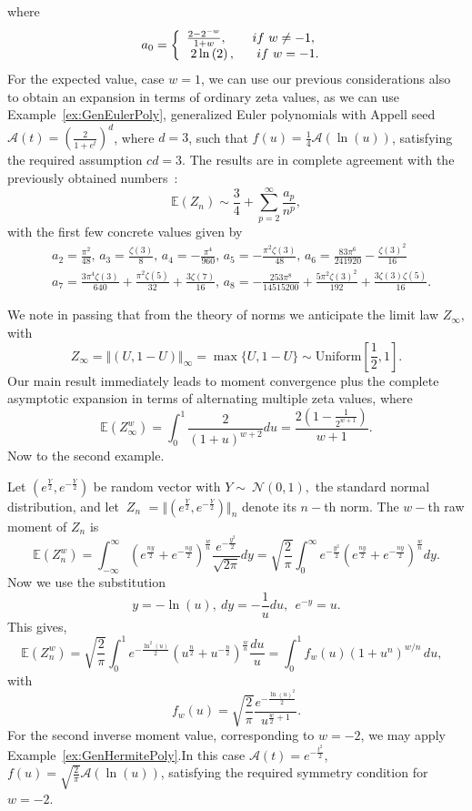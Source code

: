 \documentclass[10pt,reqno,a4paper]{amsart}%
\theoremstyle{definition}
\newcommand{\E}{\ensuremath{\mathbb{E}}} %
\newcommand{\ap}{\ensuremath{\mathcal{A}}}%
\begin{document}
where
\[
a_{0}=\left\{
\begin{array}
[c]{c}%
\frac{2-2^{-w}}{1+w},\ \ \ \ \ \ if\ w\neq-1,\ \ \\
2\ln\left(  2\right)  ,\ \ \ \ \ if\ w=-1.
\end{array}
\right.
\]
For the expected value, case $w=1$, we can use our previous considerations
also to obtain an expansion in terms of ordinary zeta values, as we can use
Example~\ref{ex:GenEulerPoly}, generalized Euler polynomials with Appell seed
$\ap(t)=(\frac{2}{1+e^{t}})^{d}$, where $d=3$, such that
$f(u)=\frac{1}{4}\ap(\ln(u))$, satisfying the required assumption
$cd=3$. The results are in complete agreement with the previously obtained
numbers~\cite{HKLL2020}:
\[
\E(Z_{n})\sim\frac{3}{4}+\sum_{p=2}^{\infty}\frac{a_{p}}{n^{p}},
\]
with the first few concrete values given by
\begin{align*}
&  a_{2}=\frac{\pi^{2}}{48},\,a_{3}=\frac{\zeta(3)}{8},\,a_{4}=-\frac{\pi^{4}%
}{960},\,a_{5}=-\frac{\pi^{2}\zeta(3)}{48},\,a_{6}=\frac{83\pi^{6}}%
{241920}-\frac{\zeta(3)^{2}}{16}\\
&  a_{7}=\frac{3\pi^{4}\zeta(3)}{640}+\frac{\pi^{2}\zeta(5)}{32}+\frac
{3\zeta(7)}{16},\,a_{8}=-\frac{253\pi^{8}}{14515200}+\frac{5\pi^{2}%
\zeta(3)^{2}}{192}+\frac{3\zeta(3)\zeta(5)}{16}.
\end{align*}


We note in passing that from the theory of norms we anticipate the limit law
$Z_{\infty}$, with
\[
Z_{\infty}=\Vert(U,1-U)\Vert_{\infty}=\max\{U,1-U\}\sim\text{Uniform}[\frac
{1}{2},1].
\]
Our main result immediately leads to moment convergence plus the complete
asymptotic expansion in terms of alternating multiple zeta values, where
\[
\E(Z_{\infty}^{w})=\int_{0}^{1}\frac{2}{(1+u)^{w+2}}du=\frac{2\left(
1-\frac{1}{2^{w+1}}\right)  }{w+1}.
\]
Now to the second example.

Let $\left(  e^{\frac{Y}{2}},e^{-\frac{Y}{2}}\right)  $ be random vector with
$Y\sim\ \mathcal{N}\left(  0,1\right)  ,$ the standard normal distribution,
and let $\ Z_{n}$ $=\Vert\left(  e^{\frac{Y}{2}},e^{-\frac{Y}{2}}\right)
\Vert_{n}$ denote its $n-$th norm. The $w-$th raw moment of $Z_{n}$
is
\[
\E(Z_{n}^{w})=\int_{-\infty}^{\infty}\left(  e^{\frac{ny}{2}%
}+e^{-\frac{ny}{2}}\right)  ^{\frac{w}{n}}\frac{e^{-\frac{y^{2}}{2}}}%
{\sqrt{2\pi}}dy=\sqrt{\frac{2}{\pi}}\int_{0}^{\infty}e^{-\frac{y^{2}}{2}%
}\left(  e^{\frac{ny}{2}}+e^{-\frac{ny}{2}}\right)  ^{\frac{w}{n}}dy.
\]
Now we use the substitution
\[
y=-\ln\left(  u\right)  ,\ dy=-\frac{1}{u}du,\ \ e^{-y}=u.
\]
This gives,%
\[
\E(Z_{n}^{w})=\sqrt{\frac{2}{\pi}}\int_{0}^{1}e^{-\frac{\ln^{2}\left(
u\right)  }{2}}\left(  u^{\frac{n}{2}}+u^{-\frac{n}{2}}\right)  ^{\frac{w}{n}%
}\frac{du}{u}=\int_{0}^{1}f_{w}(u)(1+u^{n})^{w/n}\,du,\text{ }%
\]
with%
\[
f_{w}(u)=\sqrt{\frac{2}{\pi}}\frac{e^{-\frac{\ln\left(  u\right)  ^{2}}{2}}%
}{u^{\frac{w}{2}+1}}.
\]
For the second inverse moment value, corresponding to $w=-2$, we may apply
Example~\ref{ex:GenHermitePoly}.\newline In this case $\ap%
(t)=e^{-\frac{t^{2}}{2}}$, $f(u)=\sqrt{\frac{2}{\pi}}\ap(\ln(u))$,
satisfying the required symmetry condition for $w=-2.$
\end{document}
